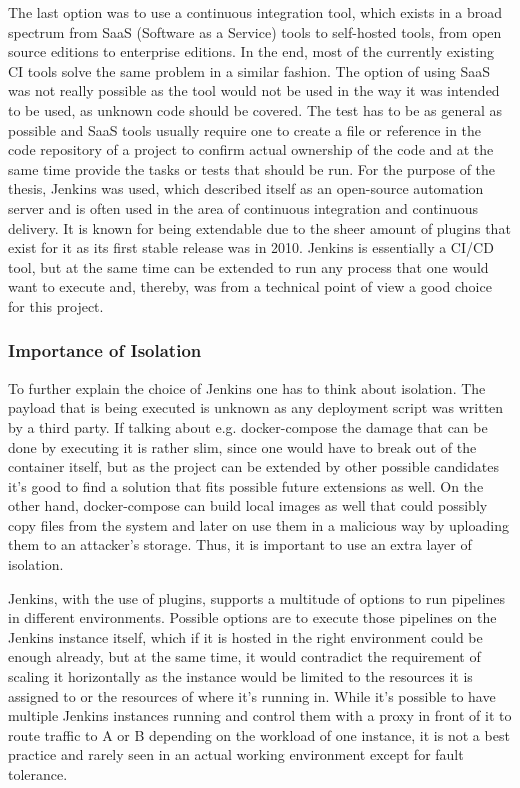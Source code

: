 The last option was to use a continuous integration tool, which exists in a broad spectrum from SaaS (Software as a Service) tools to self-hosted tools, from open source editions to enterprise editions. In the end, most of the currently existing CI tools solve the same problem in a similar fashion. The option of using SaaS was not really possible as the tool would not be used in the way it was intended to be used, as unknown code should be covered. The test has to be as general as possible and SaaS tools usually require one to create a file or reference in the code repository of a project to confirm actual ownership of the code and at the same time provide the tasks or tests that should be run.
For the purpose of the thesis, Jenkins was used, which described itself as an open-source automation server and is often used in the area of continuous integration and continuous delivery. It is known for being extendable due to the sheer amount of plugins that exist for it as its first stable release was in 2010. Jenkins is essentially a CI/CD tool, but at the same time can be extended to run any process that one would want to execute and, thereby, was from a technical point of view a good choice for this project.

\subsubsection{Importance of Isolation}
To further explain the choice of Jenkins one has to think about isolation. The payload that is being executed is unknown as any deployment script was written by a third party. If talking about e.g. docker-compose the damage that can be done by executing it is rather slim, since one would have to break out of the container itself, but as the project can be extended by other possible candidates it's good to find a solution that fits possible future extensions as well. On the other hand, docker-compose can build local images as well that could possibly copy files from the system and later on use them in a malicious way by uploading them to an attacker's storage. Thus, it is important to use an extra layer of isolation.

Jenkins, with the use of plugins, supports a multitude of options to run pipelines in different environments.
Possible options are to execute those pipelines on the Jenkins instance itself, which if it is hosted in the right environment could be enough already, but at the same time, it would contradict the requirement of scaling it horizontally as the instance would be limited to the resources it is assigned to or the resources of where it's running in. While it's possible to have multiple Jenkins instances running and control them with a proxy in front of it to route traffic to A or B depending on the workload of one instance, it is not a best practice and rarely seen in an actual working environment except for fault tolerance.

